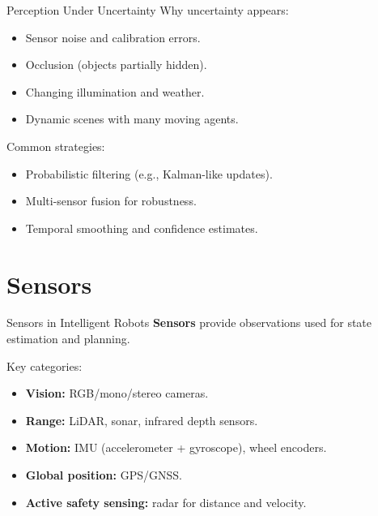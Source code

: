 \documentclass[10pt]{beamer}
\begin{document}
\begin{frame}{Perception Under Uncertainty}
    Why uncertainty appears:
    \begin{itemize}
        \item Sensor noise and calibration errors.
        \item Occlusion (objects partially hidden).
        \item Changing illumination and weather.
        \item Dynamic scenes with many moving agents.
    \end{itemize}

    \vspace{0.2cm}
    Common strategies:
    \begin{itemize}
        \item Probabilistic filtering (e.g., Kalman-like updates).
        \item Multi-sensor fusion for robustness.
        \item Temporal smoothing and confidence estimates.
    \end{itemize}
\end{frame}

\section{Sensors}

\begin{frame}{Sensors in Intelligent Robots}
    \textbf{Sensors} provide observations used for state estimation and planning.

    \vspace{0.2cm}
    Key categories:
    \begin{itemize}
        \item \textbf{Vision:} RGB/mono/stereo cameras.
        \item \textbf{Range:} LiDAR, sonar, infrared depth sensors.
        \item \textbf{Motion:} IMU (accelerometer + gyroscope), wheel encoders.
        \item \textbf{Global position:} GPS/GNSS.
        \item \textbf{Active safety sensing:} radar for distance and velocity.
    \end{itemize}
\end{frame}
\end{document}
